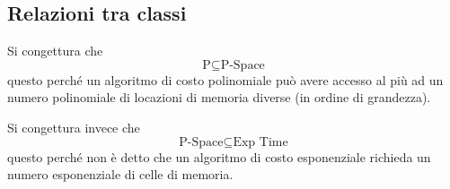 \subsection{Relazioni tra classi}
Si congettura che
\[ \text{P} \subseteq \text{P-Space} \]
questo perch\'e un algoritmo di costo polinomiale pu\`o avere accesso al pi\`u ad un numero polinomiale di locazioni di
memoria diverse (in ordine di grandezza).

Si congettura invece che
\[ \text{P-Space} \subseteq \text{Exp Time} \]
questo perch\'e non \`e detto che un algoritmo di costo esponenziale richieda un numero esponenziale di celle di memoria.
